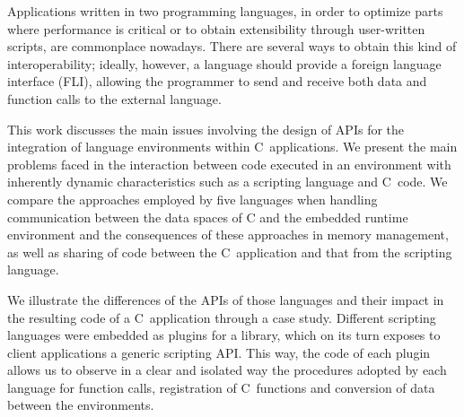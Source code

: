 Applications written in two programming languages, in order to optimize
parts where performance is critical or to obtain extensibility through
user-written scripts, are commonplace nowadays. There are several
ways to obtain this kind of interoperability; ideally, however, a
language should provide a foreign language interface (FLI), allowing
the programmer to send and receive both data and function calls to
the external language. 

This work discusses the main issues involving the design of APIs for
the integration of language environments within C~applications. We
present the main problems faced in the interaction between code executed
in an environment with inherently dynamic characteristics such as
a scripting language and C~code. We compare the approaches employed
by five languages when handling communication between the data spaces
of C and the embedded runtime environment and the consequences of
these approaches in memory management, as well as sharing of code
between the C~application and that from the scripting language.

We illustrate the differences of the APIs of those languages and their
impact in the resulting code of a C~application through a case study.
Different scripting languages were embedded as plugins for a library,
which on its turn exposes to client applications a generic scripting
API. This way, the code of each plugin allows us to observe in a clear
and isolated way the procedures adopted by each language for function
calls, registration of C~functions and conversion of data between
the environments.

